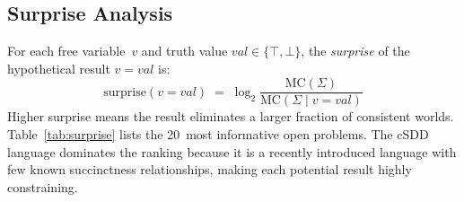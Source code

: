 \documentclass[10pt]{article}
\theoremstyle{plain}
\theoremstyle{definition}
\theoremstyle{remark}
\begin{document}
\subsection{Surprise Analysis}

For each free variable~$v$ and truth value $\textit{val} \in \{\top, \bot\}$, the \emph{surprise} of the hypothetical result $v = \textit{val}$ is:
\[
  \text{surprise}(v = \textit{val}) \;=\; \log_2 \frac{\text{MC}(\Sigma)}{\text{MC}(\Sigma \mid v = \textit{val})}
\]
Higher surprise means the result eliminates a larger fraction of consistent worlds. Table~\ref{tab:surprise} lists the 20~most informative open problems. The cSDD language dominates the ranking because it is a recently introduced language with few known succinctness relationships, making each potential result highly constraining.
\end{document}
